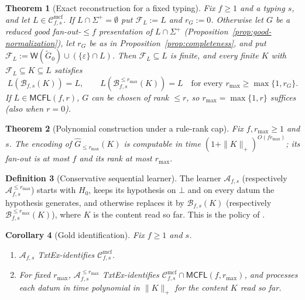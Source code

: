 \documentclass[11pt]{article}
\numberwithin{equation}{section}
\theoremstyle{plain}
\newtheorem{theorem}{Theorem}[section]
\newtheorem{corollary}[theorem]{Corollary}
\theoremstyle{definition}
\newtheorem{definition}[theorem]{Definition}
\theoremstyle{remark}
\newcommand{\Wit}{\mathsf{W}}
\newcommand{\Cmcf}[2]{\mathcal{C}^{\mathrm{mcf}}_{#1,#2}}
\newcommand{\eps}{\varepsilon}
\newcommand{\pausesym}{\bot}
\theoremstyle{plain}
\begin{document}
\begin{theorem}[Exact reconstruction for a fixed typing]
\label{thm:exact-reconstruction}
Fix $f\ge1$ and a typing $s$, and let $L\in\Cmcf{f}{s}$.  If
$L\cap\Sigma^+=\emptyset$ put $\mathcal F_L:=L$ and $r_G:=0$.  Otherwise let $G$
be a reduced good fan-out-$\le f$ presentation of $L\cap\Sigma^+$
(Proposition~\ref{prop:good-normalization}), let $r_G$ be as in
Proposition~\ref{prop:completeness}, and put
$\mathcal F_L:=\Wit(\widetilde G_0)\cup(\{\eps\}\cap L)$.  Then
$\mathcal F_L\subseteq L$ is finite, and every finite $K$ with
$\mathcal F_L\subseteq K\subseteq L$ satisfies
\[
 L(\mathcal B_{f,s}(K))=L,\qquad
 L(\mathcal B_{f,s}^{\le r_{\max}}(K))=L\quad
 \text{for every }r_{\max}\ge\max\{1,r_G\}.
\]
If $L\in\mathsf{MCFL}(f,r)$, $G$ can be chosen of rank $\le r$, so
$r_{\max}=\max\{1,r\}$ suffices (also when $r=0$).
\end{theorem}

\begin{theorem}[Polynomial construction under a rule-rank cap]
\label{thm:poly}
Fix $f,r_{\max}\ge1$ and $s$.  The encoding of $\widehat G_{\le r_{\max}}(K)$ is
computable in time $(1+\|K\|_+)^{O(fr_{\max})}$; its fan-out is at most $f$
and its rank at most $r_{\max}$.
\end{theorem}

\begin{definition}[Conservative sequential learner]
\label{def:conservative-learner}
The learner $\mathcal A_{f,s}$ (respectively $\mathcal A_{f,s}^{\le r_{\max}}$)
starts with $H_0$, keeps its hypothesis on $\pausesym$ and on every datum the
hypothesis generates, and otherwise replaces it by $\mathcal B_{f,s}(K)$
(respectively $\mathcal B_{f,s}^{\le r_{\max}}(K)$), where $K$ is the content
read so far.  This is the policy of \cite[Algorithm~1]{Yoshinaka2011}.
\end{definition}

\begin{corollary}[Gold identification]
\label{cor:gold-explanatory}
\label{cor:capped-gold-poly}
Fix $f\ge1$ and $s$.
\begin{enumerate}[label=\textup{(\roman*)}]
\item $\mathcal A_{f,s}$ TxtEx-identifies $\Cmcf{f}{s}$.
\item For fixed $r_{\max}$, $\mathcal A_{f,s}^{\le r_{\max}}$ TxtEx-identifies
$\Cmcf{f}{s}\cap\mathsf{MCFL}(f,r_{\max})$, and processes each datum in time
polynomial in $\|K\|_+$ for the content $K$ read so far.
\end{enumerate}
\end{corollary}
\end{document}

